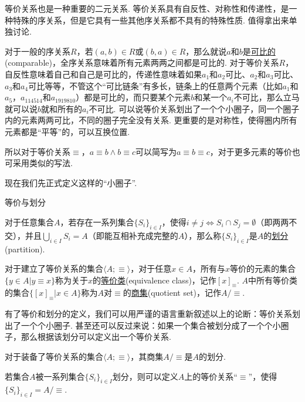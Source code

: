 等价关系也是一种重要的二元关系. 等价关系具有自反性、对称性和传递性，是一种特殊的序关系，但是它具有一些其他序关系都不具有的特殊性质. 值得拿出来单独讨论.

对于一般的序关系\(R\)，若\((a,b) \in R\)或\((b,a)\in R\)，那么就说\(a\)和\(b\)是\underline{可比的}(comparable)，全序关系意味着所有元素两两之间都是可比的. 对于等价关系\(R\)，自反性意味着自己和自己是可比的，传递性意味着如果\(a_1\)和\(a_2\)可比、\(a_2\)和\(a_3\)可比、\(a_3\)和\(a_4\)可比等等，不管这个“可比链条”有多长，链条上的任意两个元素（比如\(a_1\)和\(a_5\)，\(a_{114514}\)和\(a_{1919810}\)）都是可比的，而只要某个元素\(b\)和某一个\(a_i\)不可比，那么立马就可以说\(b\)就和所有的\(a_i\)不可比. 可以说等价关系划出了一个个小圈子，同一个圈子内的元素两两可比，不同的圈子完全没有关系. 更重要的是对称性，使得圈内所有元素都是“平等”的，可以互换位置. 

\begin{reference}
    所以对于等价关系\(\equiv\)，\(a \equiv b \wedge b \equiv c\)可以简写为\(a \equiv b \equiv c\)，对于更多元素的等价也可采用类似的写法.
\end{reference}

现在我们先正式定义这样的“小圈子”.

\begin{definition}{等价与划分}
    \par
    对于任意集合\(A\)，若存在一系列集合\(\{S_i\}_{i \in I}\)，使得\(i \neq j \Leftrightarrow S_i \cap S_j = \emptyset\)（即两两不交），并且\(\displaystyle{\bigcup_{i \in I}S_i = A}\)（即能互相补充成完整的\(A\)），那么称\(\{S_i\}_{i \in I}\)是\(A\)的\underline{划分}(partition).
    \par
    对于建立了等价关系的集合\(\langle A; \equiv \rangle\)，对于任意\(x \in A\)，所有与\(x\)等价的元素的集合\(\{y\in A | y \equiv x\}\)称为关于\(x\)的\underline{等价类}(equivalence class)，记作\([x]_{\equiv}\). \(A\)中所有等价类的集合\(\{[x]_\equiv | x \in A\}\)称为\(A\)对\(\equiv\)的\underline{商集}(quotient set)，记作\(A/\equiv\).
\end{definition}

有了等价和划分的定义，我们可以用严谨的语言重新叙述以上的论断：等价关系划出了一个个小圈子. 甚至还可以反过来说：如果一个集合被划分成了一个个小圈子，那么根据该划分可以定义出一个等价关系.

\begin{theorem}{}
    \par
    对于装备了等价关系的集合\(\langle A; \equiv \rangle\)，其商集\(A/\equiv\)是\(A\)的划分.
    \par
    若集合\(A\)被一系列集合\(\{S_i\}_{i \in I}\)划分，则可以定义\(A\)上的等价关系“\(\equiv\)”，使得\(\{S_i\}_{i \in I} = A/\equiv\).
\end{theorem}

